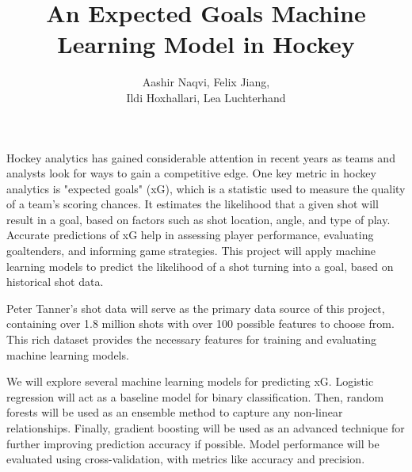 \documentclass[12pt]{article}
\title{An Expected Goals Machine Learning Model in Hockey}
\author{Aashir Naqvi, Felix Jiang, \\ Ildi Hoxhallari, Lea Luchterhand}
\begin{document}
\maketitle

Hockey analytics has gained considerable attention in recent years as teams and analysts look for ways to gain a competitive edge. One key metric in hockey analytics is "expected goals" (xG), which is a statistic used to measure the quality of a team's scoring chances. It estimates the likelihood that a given shot will result in a goal, based on factors such as shot location, angle, and type of play. Accurate predictions of xG help in assessing player performance, evaluating goaltenders, and informing game strategies. This project will apply machine learning models to predict the likelihood of a shot turning into a goal, based on historical shot data.
\\
\par
Peter Tanner's shot data will serve as the primary data source of this project, containing over 1.8 million shots with over 100 possible features to choose from. This rich dataset provides the necessary features for training and evaluating machine learning models.
\\
\par
We will explore several machine learning models for predicting xG. Logistic regression will act as a baseline model for binary classification. Then, random forests will be used as an ensemble method to capture any non-linear relationships. Finally, gradient boosting will be used as an advanced technique for further improving prediction accuracy if possible.
Model performance will be evaluated using cross-validation, with metrics like accuracy and precision.
\end{document}
